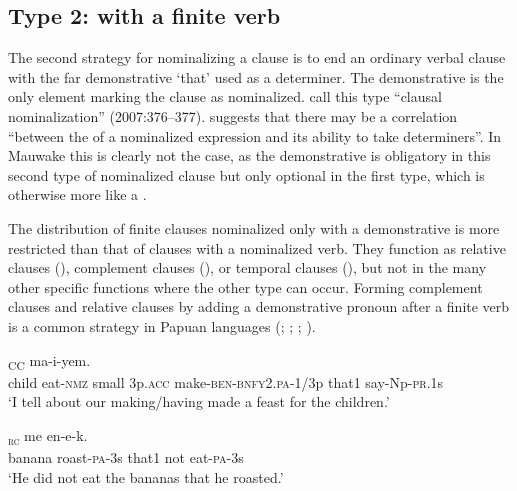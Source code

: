 \subsection{Type 2: with a finite verb}
{}
The second strategy for nominalizing a clause is to end an ordinary verbal clause with the far demonstrative  `that' used as a determiner. The demonstrative is the only element marking the clause as nominalized. \citeauthor{ComrieEtAl2007}  call this type ``clausal nominalization'' (2007:376--377). \citet[506]{Givon1990} suggests that there may be a correlation ``between the  of a nominalized expression and its ability to take determiners''. In Mauwake this is clearly not the case, as the demonstrative is obligatory in this second type of nominalized clause but only optional in the first type, which is otherwise more like a .

The distribution of finite clauses nominalized only with a demonstrative is more restricted than that of clauses with a nominalized verb. They function as relative clauses (), complement clauses (), or temporal clauses (), but not in the many other specific functions where the other type can occur. Forming complement clauses and relative clauses by adding a demonstrative pronoun after a finite verb is a common strategy in Papuan languages (\citealt{Reesink1983b}; \citeyear[228]{Reesink1987}; \citealt[77]{Farr1999}; \citealt[192]{Whitehead2004}). 

\ea%
\label{ex:x1260}
\textsubscript{CC}  ma-i-yem.
 \\
     child  eat-\textsc{nmz}  small  3p.\textsc{acc}  make-\textsc{ben}-\textsc{bnfy}2.\textsc{pa}-1/3p that1  say-Np-\textsc{pr}.1s \\
\glt `I tell about our making/having made a feast for the children.'
\z

\ea%
\label{ex:x1261}
\textsubscript{\textsc{rc}}  me  en-e-k. \\
     banana  roast-\textsc{pa}-3s  that1  not  eat-\textsc{pa}-3s \\
\glt `He did not eat the bananas that he roasted.'
\z

